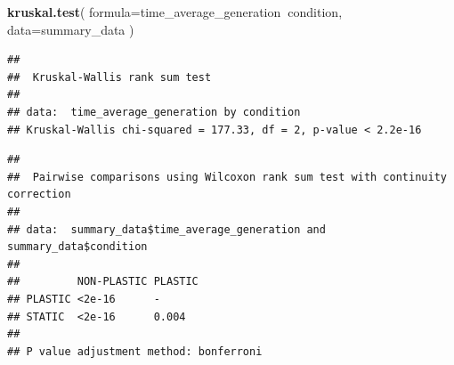 \documentclass[]{book}
\newenvironment{Shaded}{\begin{snugshade}}{\end{snugshade}}
\newcommand{\DataTypeTok}[1]{\textcolor[rgb]{0.13,0.29,0.53}{#1}}
\newcommand{\KeywordTok}[1]{\textcolor[rgb]{0.13,0.29,0.53}{\textbf{#1}}}
\newcommand{\NormalTok}[1]{#1}
\newcommand{\OperatorTok}[1]{\textcolor[rgb]{0.81,0.36,0.00}{\textbf{#1}}}
\newcommand{\StringTok}[1]{\textcolor[rgb]{0.31,0.60,0.02}{#1}}
\begin{document}
\begin{Shaded}
\begin{Highlighting}[]
\KeywordTok{kruskal.test}\NormalTok{(}
  \DataTypeTok{formula=}\NormalTok{time_average_generation}\OperatorTok{~}\NormalTok{condition,}
  \DataTypeTok{data=}\NormalTok{summary_data}
\NormalTok{)}
\end{Highlighting}
\end{Shaded}

\begin{verbatim}
## 
##  Kruskal-Wallis rank sum test
## 
## data:  time_average_generation by condition
## Kruskal-Wallis chi-squared = 177.33, df = 2, p-value < 2.2e-16
\end{verbatim}

\begin{Shaded}
\end{Shaded}

\begin{verbatim}
## 
##  Pairwise comparisons using Wilcoxon rank sum test with continuity correction 
## 
## data:  summary_data$time_average_generation and summary_data$condition 
## 
##         NON-PLASTIC PLASTIC
## PLASTIC <2e-16      -      
## STATIC  <2e-16      0.004  
## 
## P value adjustment method: bonferroni
\end{verbatim}

\begin{Shaded}
\end{Shaded}
\end{document}
